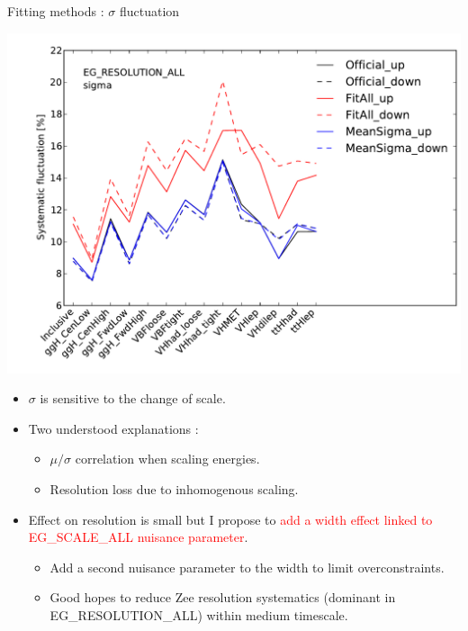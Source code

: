 \begin{frame}{Fitting methods : $\sigma$ fluctuation }

  \begin{minipage}{0.4\linewidth}
    \includegraphics[width=\linewidth]{plots/Backup/h013_meanSigma_PhotonSyst_EG_RESOLUTION_ALL_sigma.pdf}\\
  \end{minipage}
  \hfill
  \begin{minipage}{0.59\linewidth}
    \begin{itemize}
    \item $\sigma$ is sensitive to the change of scale.
    \item Two understood explanations :
      \begin{itemize}
      \item $\mu /\sigma$ correlation when scaling energies.
      \item Resolution loss due to inhomogenous scaling.
        \end{itemize}
      \vfill
    \item Effect on resolution is small but I propose to \textcolor{red}{add a width effect linked to EG\_SCALE\_ALL nuisance parameter}.
      \begin{itemize}
      \item Add a second nuisance parameter to the width to limit overconstraints.
      \item Good hopes to reduce Zee resolution systematics (dominant in EG\_RESOLUTION\_ALL) within medium timescale.
      \end{itemize}
    \end{itemize}
  \end{minipage}
\end{frame}

